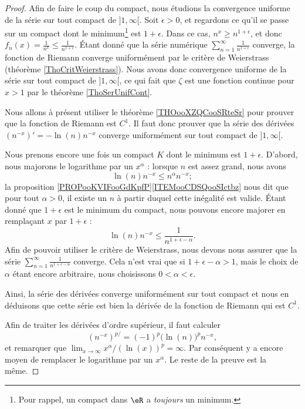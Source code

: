 \begin{proof}
	Afin de faire le coup du compact, nous étudions la convergence uniforme de la série sur tout compact de \( ]1,\infty[\). Soit \( \epsilon>0\), et regardons ce qu'il se passe sur un compact dont le minimum\footnote{Pour rappel, un compact dans \( \eR\) a \emph{toujours} un minimum.} est \( 1+\epsilon\). Dans ce cas, \( n^x\geq n^{1+\epsilon}\), et donc \( f_n(x)=\frac{ 1 }{ n^x }\leq \frac{1}{ n^{1+\epsilon} }\). Étant donné que la série numérique \( \sum_{n=1}^{\infty}\frac{1}{ n^{1+\epsilon} }\) converge, la fonction de Riemann converge uniformément par le critère de Weierstrass (théorème \ref{ThoCritWeierstrass}). Nous avons donc convergence uniforme de la série sur tout compact de \( ]1,\infty[\), ce qui fait que \( \zeta\) est une fonction continue pour \( x>1\) par le théorème \ref{ThoSerUnifCont}.

	Nous allons à présent utiliser le théorème \ref{THOooXZQCooSRteSr} pour prouver que la fonction de Riemann est \( C^1\). Il faut donc prouver que la série des dérivées \( (n^{-x})'=-\ln(n)n^{-x}\) converge uniformément sur tout compact de \( ]1,\infty[\).

	Nous prenons encore une fois un compact \( K\) dont le minimum est \( 1+\epsilon\). D'abord, nous majorons le logarithme par un \( x^{\alpha}\) : lorsque \( n\) est assez grand, nous avons
	\begin{equation}
		\ln(n)n^{-x}\leq n^{\alpha}n^{-x};
	\end{equation}
	la proposition \ref{PROPooKVIFooGdKpfP}\ref{ITEMooCDSQooSIctbz} nous dit que pour tout \( \alpha>0\), il existe un \( n\) à partir duquel cette inégalité est valide. Étant donné que \( 1+\epsilon\) est le minimum du compact, nous pouvons encore majorer en remplaçant \( x\) par \( 1+\epsilon\) :
	\begin{equation}
		\ln(n)n^{-x}\leq \frac{1}{ n^{1+\epsilon-\alpha} }.
	\end{equation}
	Afin de pouvoir utiliser le critère de Weierstrass, nous devons nous assurer que la série \( \sum_{n=1}^{\infty} \frac{ 1 }{ n^{1+\epsilon-\alpha} } \) converge. Cela n'est vrai que si \( 1+\epsilon-\alpha > 1\), mais le choix de \( \alpha\) étant encore arbitraire, nous choisissons \( 0<\alpha<\epsilon\).

	Ainsi, la série des dérivées converge uniformément sur tout compact et nous en déduisons que cette série est bien la dérivée de la fonction de Riemann qui est \( C^1\).

	Afin de traiter les dérivées d'ordre supérieur, il faut calculer
	\begin{equation}
		(n^{-x})^{p/}=(-1)^p\big( \ln(n) \big)^p n^{-x},
	\end{equation}
	et remarquer que \( \lim_{x\to\infty} x^{\alpha}/(\ln(x))^p=\infty\). Par conséquent y a encore moyen de remplacer le logarithme par un \( x^{\alpha}\). Le reste de la preuve est la même.
\end{proof}

